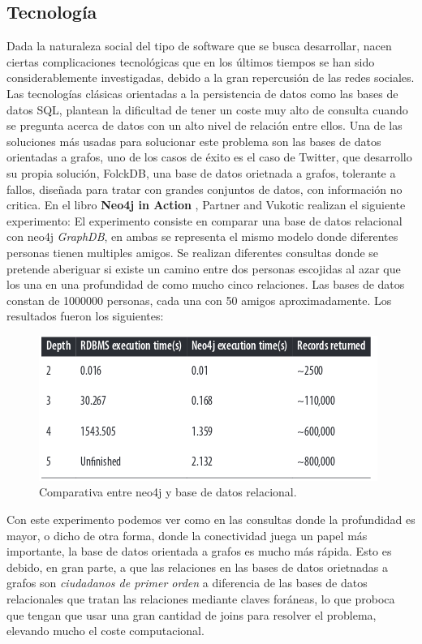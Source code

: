 \documentclass[12pt]{article} %
\begin{document}
\subsection{Tecnología}
Dada la naturaleza social del tipo de software que se busca desarrollar, nacen ciertas complicaciones tecnológicas que en los últimos tiempos se han sido considerablemente investigadas, debido a la gran repercusión de las redes sociales. Las tecnologías clásicas orientadas a la persistencia de datos como las bases de datos SQL, plantean la dificultad de tener un coste muy alto de consulta cuando se pregunta acerca de datos  con un alto nivel de relación entre ellos. Una de las soluciones más usadas para solucionar este problema son las bases de datos orientadas a grafos, uno de los casos de éxito es el caso de Twitter, que desarrollo su propia solución, FolckDB, una base de datos orietnada a grafos, tolerante a fallos, diseñada para tratar con grandes conjuntos de datos, con información no critica.\newline
En el libro \textbf{Neo4j in Action} \cite{neo4jinaction}, Partner and Vukotic realizan el siguiente experimento: \newline
El experimento consiste en comparar una base de datos relacional con neo4j \textit{GraphDB}, en ambas se representa el mismo modelo donde diferentes personas tienen multiples amigos. Se realizan diferentes consultas donde se pretende aberiguar si existe un camino entre dos personas escojidas al azar que los una en una profundidad de como mucho cinco relaciones. Las bases de datos constan de 1000000 personas, cada una con 50 amigos aproximadamente. Los resultados fueron los siguientes:

\begin{figure}[ht!]
\center
\includegraphics[scale=0.5]{table_find_friends_experiment.png}
\caption{Comparativa entre neo4j y base de datos relacional.}
\label{fig:compa}
\end{figure}

Con este experimento podemos ver como en las consultas donde la profundidad es mayor, o dicho de otra forma, donde la conectividad juega un papel más importante, la base de datos orientada a grafos es mucho más rápida. Esto es debido, en gran parte, a que las relaciones en las bases de datos orietnadas a grafos son \textit{ciudadanos de primer orden} a diferencia de las bases de datos relacionales que tratan las relaciones mediante claves foráneas, lo que proboca que tengan que usar una gran cantidad de joins para resolver el problema, elevando mucho el coste computacional.
\end{document}
